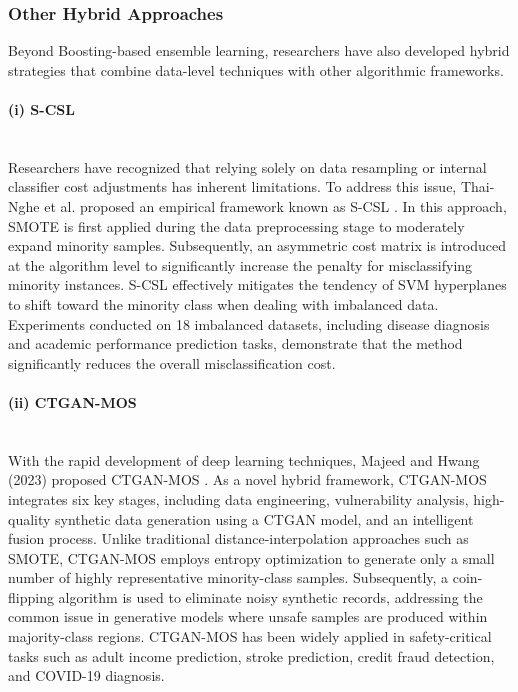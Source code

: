 \documentclass[sigconf]{acmart}
\begin{document}
\subsubsection{Other Hybrid Approaches }

Beyond Boosting-based ensemble learning, researchers have also developed hybrid strategies that combine data-level techniques with other algorithmic frameworks. 

\paragraph{(i) S-CSL }~\\
Researchers have recognized that relying solely on data resampling or internal classifier cost adjustments has inherent limitations. To address this issue, Thai-Nghe et al. proposed an empirical framework known as S-CSL \cite{29}. In this approach, SMOTE is first applied during the data preprocessing stage to moderately expand minority samples. Subsequently, an asymmetric cost matrix is introduced at the algorithm level to significantly increase the penalty for misclassifying minority instances. S-CSL effectively mitigates the tendency of SVM hyperplanes to shift toward the minority class when dealing with imbalanced data. Experiments conducted on 18 imbalanced datasets, including disease diagnosis and academic performance prediction tasks, demonstrate that the method significantly reduces the overall misclassification cost. 

\paragraph{(ii) CTGAN-MOS}~\\

With the rapid development of deep learning techniques, Majeed and Hwang (2023) proposed CTGAN-MOS \cite{30}.  As a novel hybrid framework, CTGAN-MOS integrates six key stages, including data engineering, vulnerability analysis, high-quality synthetic data generation using a CTGAN model, and an intelligent fusion process. Unlike traditional distance-interpolation approaches such as SMOTE, CTGAN-MOS employs entropy optimization to generate only a small number of highly representative minority-class samples. Subsequently, a coin-flipping algorithm is used to eliminate noisy synthetic records, addressing the common issue in generative models where unsafe samples are produced within majority-class regions. CTGAN-MOS has been widely applied in safety-critical tasks such as adult income prediction, stroke prediction, credit fraud detection, and COVID-19 diagnosis. 
\end{document}
